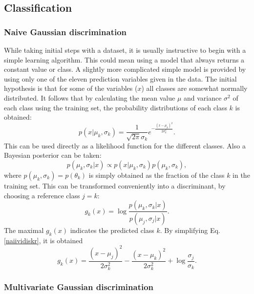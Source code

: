 \documentclass[twoside]{article}
\begin{document}
\begin{multicols}{2}
\subsection{Classification}

\subsubsection{Naive Gaussian discrimination} \label{method:naiivig}

While taking initial steps with a dataset, it is usually instructive to begin with a simple
learning algorithm. This could mean using a model that always returns a constant value or
class. A slightly more complicated simple model is provided by using only one of the eleven prediction variables
given in the data. The initial hypothesis is that for some of the variables ($x$) all classes are somewhat
normally distributed. It follows that by calculating the mean value 
$\mu$ and variance $\sigma^2$ of each class using the training set, the probability distributions of 
each class $k$ is obtained:
\begin{equation}
 p(x|\mu_k,\sigma_k) = \frac{1}{\sqrt{2\pi} \sigma_k} e^{-\frac{(x-\mu_k)^2}{2\sigma_k^2}}.
\end{equation}
This can be used directly as a likelihood function for the different classes. Also a Bayesian posterior
can be taken:
\begin{equation}\label{posterior}
 p(\mu_k,\sigma_k|x) \propto p(x|\mu_k,\sigma_k) p(\mu_k,\sigma_k),
\end{equation}
where $p(\mu_k,\sigma_k) = p(\theta_k)$ is simply obtained as the fraction of the class $k$ in the 
training set. This can be transformed conveniently into a discriminant, by choosing a reference
class $j = k$:
\begin{equation}\label{naiividiskr}
 g_k(x) = \log \frac{p(\mu_k,\sigma_k|x)}{p(\mu_j,\sigma_j|x)}.
\end{equation}
The maximal $g_k(x)$ indicates the predicted class $k$. By simplifying Eq. \eqref{naiividiskr},
it is obtained
\begin{equation}\label{naiividiskr2}
 g_k(x) = \frac{(x-\mu_j)^2}{2\sigma_k^2}-\frac{(x-\mu_k)^2}{2\sigma_k^2} + 
 \log \frac{\sigma_j}{\sigma_k}.
\end{equation}

\subsubsection{Multivariate Gaussian discrimination}\label{method:multig}


\end{multicols}
\end{document}

